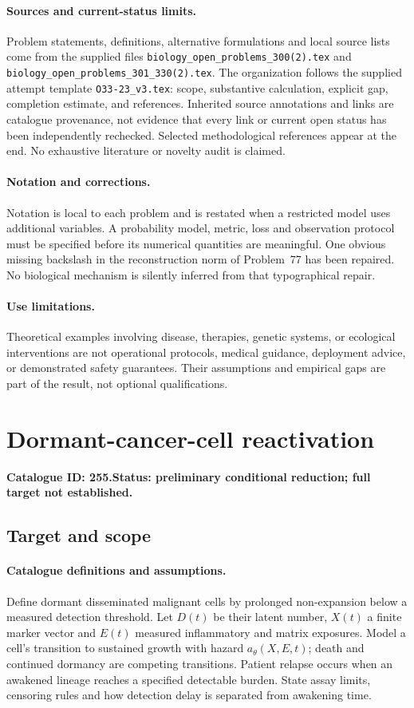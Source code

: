 \documentclass[11pt]{article}
\begin{document}
\paragraph{Sources and current-status limits.}
Problem statements, definitions, alternative formulations and local source lists
come from the supplied files
\texttt{biology\_open\_problems\_300(2).tex} and
\texttt{biology\_open\_problems\_301\_330(2).tex}.
The organization follows the supplied attempt template
\texttt{O33-23\_v3.tex}: scope, substantive calculation, explicit gap,
completion estimate, and references. Inherited source annotations and links are
catalogue provenance, not evidence that every link or current open status has
been independently rechecked. Selected methodological references appear at the
end. No exhaustive literature or novelty audit is claimed.

\paragraph{Notation and corrections.}
Notation is local to each problem and is restated when a restricted model uses
additional variables. A probability model, metric, loss and observation protocol
must be specified before its numerical quantities are meaningful. One obvious
missing backslash in the reconstruction norm of Problem~77 has been repaired.
No biological mechanism is silently inferred from that typographical repair.

\paragraph{Use limitations.}
Theoretical examples involving disease, therapies, genetic systems, or ecological
interventions are not operational protocols, medical guidance, deployment advice,
or demonstrated safety guarantees. Their assumptions and empirical gaps are part
of the result, not optional qualifications.

\setcounter{section}{254}
\section{Dormant-cancer-cell reactivation}
\label{prob:255}
\noindent\textbf{Catalogue ID: 255.}\quad \textbf{Status: preliminary conditional reduction; full target not established.}
\subsection{Target and scope}
\paragraph{Catalogue definitions and assumptions.}
Define dormant disseminated malignant cells by prolonged non-expansion below a measured detection threshold. Let $D(t)$ be their latent number, $X(t)$ a finite marker vector and $E(t)$ measured inflammatory and matrix exposures. Model a cell's transition to sustained growth with hazard $a_\theta(X,E,t)$; death and continued dormancy are competing transitions. Patient relapse occurs when an awakened lineage reaches a specified detectable burden. State assay limits, censoring rules and how detection delay is separated from awakening time.
\end{document}
